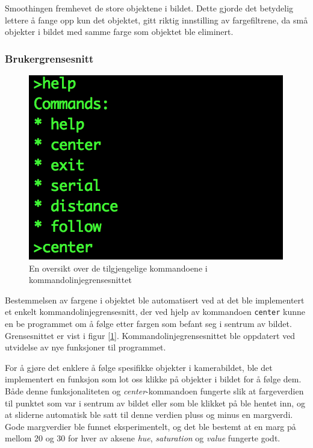 Smoothingen fremhevet de store objektene i bildet. Dette gjorde det betydelig lettere å fange opp kun det objektet, gitt riktig innstilling av fargefiltrene, da små objekter i bildet med samme farge som objektet ble eliminert.

\subsubsection{Brukergrensesnitt}
\begin{figure}
	\centering
	\includegraphics[width=\linewidth]{img/command-menu.png}
	\caption{En oversikt over de tilgjengelige kommandoene i kommandolinjegrensesnittet}
	\label{fig:commandmenu}
\end{figure}
Bestemmelsen av fargene i objektet ble automatisert ved at det ble implementert et enkelt kommandolinjegrensesnitt, der ved hjelp av kommandoen \texttt{center} kunne en be programmet om å følge etter fargen som befant seg i sentrum av bildet. Grensesnittet er vist i figur [\ref{fig:commandmenu}]. Kommandolinjegrensesnittet ble oppdatert ved utvidelse av nye funksjoner til programmet. 

For å gjøre det enklere å følge spesifikke objekter i kamerabildet, ble det implementert en funksjon som lot oss klikke på objekter i bildet for å følge dem. Både denne funksjonaliteten og \textit{center}-kommandoen fungerte slik at fargeverdien til punktet som var i sentrum av bildet eller som ble klikket på ble hentet inn, og at sliderne automatisk ble satt til denne verdien pluss og minus en margverdi. Gode margverdier ble funnet eksperimentelt, og det ble bestemt at en marg på mellom $20$ og $30$ for hver av aksene \emph{hue}, \emph{saturation} og \emph{value} fungerte godt.

